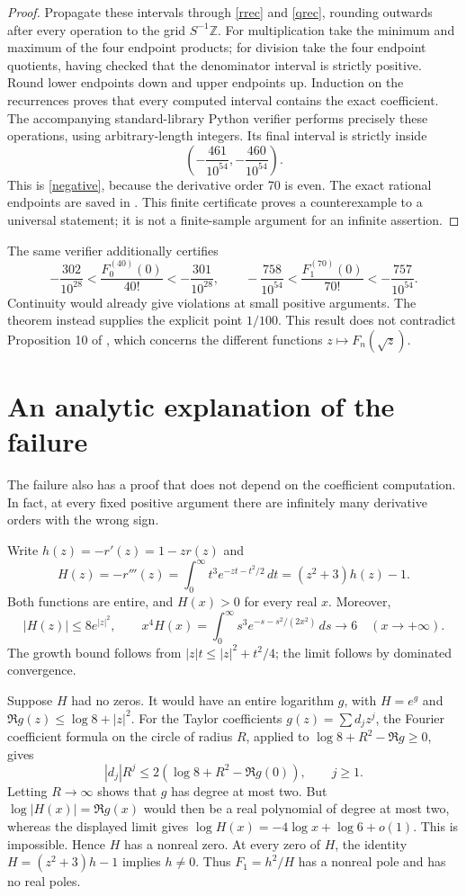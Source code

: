 \documentclass[11pt]{article}
\begin{document}
\begin{proof}
Propagate these intervals through \eqref{rrec} and \eqref{qrec}, rounding
outwards after every operation to the grid \(S^{-1}\mathbb Z\).
For multiplication take the minimum and maximum of the four endpoint
products; for division take the four endpoint quotients, having checked
that the denominator interval is strictly positive. Round lower endpoints
down and upper endpoints up. Induction on the recurrences proves that
every computed interval contains the exact coefficient.
The accompanying standard-library Python verifier performs precisely
these operations, using arbitrary-length integers. Its final interval
is strictly inside
\[
 \left(-\frac{461}{10^{54}},-\frac{460}{10^{54}}\right).
\]
This is \eqref{negative}, because the derivative order 70 is even.
The exact rational endpoints are saved in .
This finite certificate proves a counterexample to a universal statement;
it is not a finite-sample argument for an infinite assertion.
\end{proof}

The same verifier additionally certifies
\[
 -\frac{302}{10^{28}}<\frac{F_0^{(40)}(0)}{40!}
 <-\frac{301}{10^{28}},\qquad
 -\frac{758}{10^{54}}<\frac{F_1^{(70)}(0)}{70!}
 <-\frac{757}{10^{54}}.
\]
Continuity would already give violations at small positive arguments.
The theorem instead supplies the explicit point \(1/100\).
This result does not contradict Proposition 10 of \cite{FS}, which
concerns the different functions \(z\mapsto F_n(\sqrt z)\).

\section*{An analytic explanation of the failure}
The failure also has a proof that does not depend on the coefficient
computation. In fact, at every fixed positive argument there are
infinitely many derivative orders with the wrong sign.

Write \(h(z)=-r'(z)=1-zr(z)\) and
\[
 H(z)=-r'''(z)=\int_0^\infty t^3e^{-zt-t^2/2}\,dt
              =(z^2+3)h(z)-1.
\]
Both functions are entire, and \(H(x)>0\) for every real \(x\).
Moreover,
\[
 |H(z)|\leq8e^{|z|^2},\qquad
 x^4H(x)=\int_0^\infty s^3e^{-s-s^2/(2x^2)}\,ds\longrightarrow6
 \quad(x\to+\infty).
\]
The growth bound follows from
\(|z|t\leq |z|^2+t^2/4\); the limit follows by dominated convergence.

Suppose \(H\) had no zeros. It would have an entire logarithm \(g\),
with \(H=e^g\) and \(\Re g(z)\leq\log8+|z|^2\).
For the Taylor coefficients \(g(z)=\sum d_jz^j\), the Fourier
coefficient formula on the circle of radius \(R\), applied to
\(\log8+R^2-\Re g\geq0\), gives
\[
 |d_j|R^j\leq2(\log8+R^2-\Re g(0)),\qquad j\geq1.
\]
Letting \(R\to\infty\) shows that \(g\) has degree at most two.
But \(\log|H(x)|=\Re g(x)\) would then be a real polynomial of
degree at most two, whereas the displayed limit gives
\(\log H(x)=-4\log x+\log6+o(1)\). This is impossible.
Hence \(H\) has a nonreal zero. At every zero of \(H\), the identity
\(H=(z^2+3)h-1\) implies \(h\ne0\). Thus \(F_1=h^2/H\) has a
nonreal pole and has no real poles.
\end{document}
